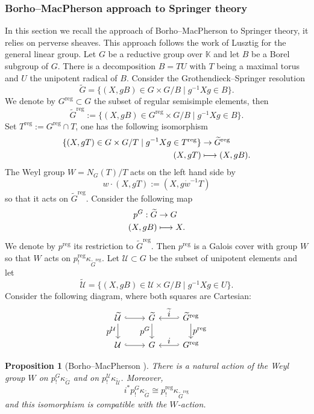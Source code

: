 \documentclass[11pt]{article}
\let\ts\textstyle
\newcommand\mto{\mathchoice{\longmapsto}{\mapsto}{\mapsto}{\mapsto}}
\theoremstyle{definition}
\theoremstyle{plain}
\newtheorem{proposition}[definition]{Proposition}
\DeclareMathOperator{\reg}{reg}
\newcommand{\map}[5]{%
\begin{split}
#1: #2 & \to #3 \\
#4 & \mto #5
\end{split}%
}
\newcommand\KK{\mathbb K }
\newcommand{\inv}{^{-1}}
\begin{document}
\subsubsection{Borho--MacPherson approach to Springer theory}\label{subsect_springer_BM}
In this section we recall the approach of Borho--MacPherson \cite{Borho_MacPherson} to Springer theory, it relies on perverse sheaves. This approach follows the work of Lusztig \cite{Lusztig81} for the general linear group. Let $G$ be a reductive group over $\KK$ and let $B$ be a Borel subgroup of $G$. There is a decomposition $B=T U$ with $T$ being a maximal torus and $U$ the unipotent radical of $B$. Consider the Grothendieck--Springer resolution
\[
\widetilde{G}=\lbrace (X,g B)\in G \times G/B \mid g\inv X g\in B\rbrace.
\]
We denote by $G^{\reg}\subset G$ the subset of regular semisimple elements, then
\[
\widetilde{G}^{\reg}:=\lbrace (X,g B)\in G^{\reg} \times G/B \mid g\inv X g\in B\rbrace.
\]
Set $T^{\reg}:=G^{\reg}\cap T$, one has the following isomorphism
\[
\begin{split}
\lbrace (X,g T)\in G\times G/T \mid g\inv X g \in T^{\reg}\rbrace& \to\widetilde{G}^{\reg} \\
(X,g T) & \mto (X, g B).
\end{split}
\]
The Weyl group $W=N_G(T)/T$ acts on the left hand side by
\[
w\cdot(X,g T) := (X, g \Dot{w}\inv T)
\]
so that it acts on $\widetilde{G}^{\reg}$.
Consider the following map
\[
\map{p^G}{\widetilde{G}}{G}{(X,g B)}{X.}
\]
We denote by $p^{\reg}$ its restriction to $\widetilde{G}^{\reg}$. Then $p^{\reg}$ is a Galois cover with group $W$ so that $W$ acts on $p^{\reg}_!\kappa_{\widetilde{G}^{\reg}}$.
Let $\mathcal{U}\subset G$ be the subset of unipotent elements and let
\[
\widetilde{\mathcal{U}}=\lbrace (X,g B)\in \mathcal{U} \times G/B \mid g\inv X g\in U\rbrace.
\]
Consider the following diagram, where both squares are Cartesian:
\[
\begin{tikzcd}
\widetilde{\mathcal{U}} \arrow[r,hookrightarrow] \arrow[d,"\ts p^{\mathcal{U}}",swap] & \widetilde{G} \arrow[d,"\ts p^G",swap] \arrow[r,hookleftarrow,"\ts\widetilde{i}"] & \widetilde{G}^{\reg} \arrow[d,"\ts p^{\reg}"] \\
\mathcal{U} \arrow[r,hookrightarrow] & G \arrow[r,hookleftarrow,"\ts i"] & G^{\reg}
\end{tikzcd}
\]

\begin{proposition}[Borho--MacPherson {\cite[2.6]{Borho_MacPherson}}]
There is a natural action of the Weyl group $W$ on $p^G_! \kappa_{\widetilde{G}}$ and on $p^{\mathcal{U}}_! \kappa_{\widetilde{\mathcal{U}}}$. Moreover,
\[
i^* p^G_! \kappa_{\widetilde{G}} \cong p^{\reg}_!\kappa_{\widetilde{G}^{\reg}}
\]
and this isomorphism is compatible with the $W$-action.
\end{proposition}
\end{document}
